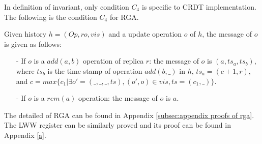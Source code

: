 In definition of invariant, only condition $C_4$ is specific to CRDT implementation. The following is the condition $C_4$ for RGA.

\begin{example}
\label{example:c4 for rga}
Given history $h = (\mathit{Op},\mathit{ro},\mathit{vis})$ and a update operation $o$ of $h$, the message of $o$ is given as follows:

\begin{itemize}
\setlength{\itemsep}{0.5pt}
\item[-] If $o$ is a $\mathit{add}(a,b)$ operation of replica $r$: the message of $o$ is $(a,\mathit{ts}_a,\mathit{ts}_b)$, where $\mathit{ts}_b$ is the time-stamp of operation $\mathit{add}(b,\_)$ in $h$, $\mathit{ts}_a = (c+1, r)$, and $c = \mathit{max}\{ c_1 \vert \exists o' = (\_,\_,\_,\mathit{ts}), (o',o) \in \mathit{vis}, \mathit{ts} = (c_1,\_) \}$.

\item[-] If $o$ is a $\mathit{rem}(a)$ operation: the message of $o$ is $a$.
\end{itemize}
\end{example}

The detailed of RGA can be found in Appendix \ref{subsec:appendix proofs of rga}. The LWW register can be similarly proved and its proof can be found in Appendix \ref{a}. 













